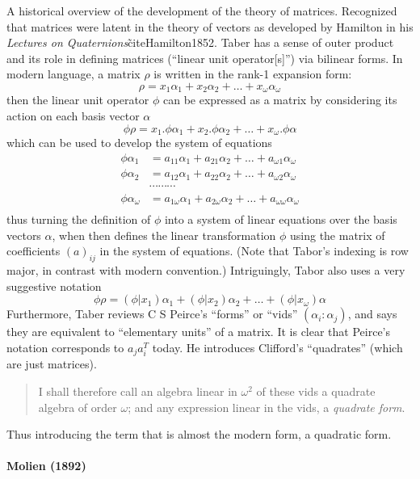 A historical overview of the development of the theory of matrices.
Recognized that matrices were latent in the theory of vectors as developed by Hamilton in his \textit{Lectures on Quaternions}\~cite{Hamilton1852}.
Taber has a sense of outer product and its role in defining matrices (``linear unit operator[s]'') via bilinear forms. In modern language,
a matrix $\rho$ is written in the rank-1 expansion form:
\[
\rho = x_1 \alpha_1 + x_2 \alpha_2 + \dots + x_\omega \alpha_\omega
\]
then the linear unit operator $\phi$ can be expressed as a matrix by considering its action on each basis vector $\alpha$
\[
\phi\rho = x_1.\phi\alpha_1 + x_2.\phi\alpha_2 + \dots + x_\omega.\phi\alpha
\]
which can be used to develop the system of equations
\begin{align}
\phi \alpha_1 & = a_{11} \alpha_1 + a_{21} \alpha_2 + \dots + a_{\omega 1} \alpha_\omega \\
\phi \alpha_2 & = a_{12} \alpha_1 + a_{22} \alpha_2 + \dots + a_{\omega 2} \alpha_\omega \\
              & \cdots \cdots \cdots \\
\phi \alpha_\omega & = a_{1\omega} \alpha_1 + a_{2\omega} \alpha_2 + \dots + a_{\omega \omega} \alpha_\omega \\
\end{align}
thus turning the definition of $\phi$ into a system of linear equations over
the basis vectors $\alpha$, when then defines the linear transformation $\phi$
using the matrix of coefficients ${(a)}_{ij}$ in the system of equations.  (Note
that Tabor's indexing is row major, in contrast with modern convention.)
Intriguingly, Tabor also uses a very suggestive notation
\[
\phi\rho = (\phi|x_1)\alpha_1 + (\phi|x_2)\alpha_2 + \dots + (\phi|x_\omega)\alpha
\]
Furthermore, Taber reviews C S Peirce's ``forms'' or ``vids'' $(\alpha_i :
\alpha_j)$, and says they are equivalent to ``elementary units'' of a matrix.
It is clear that Peirce's notation corresponds to $a_j a_i^T$ today.  He
introduces Clifford's ``quadrates'' (which are just matrices).
\begin{quote}
I shall therefore call an algebra linear in $\omega^2$ of these vids a quadrate
algebra of order $\omega$; and any expression linear in the vids, a
\textit{quadrate form}.
\end{quote}
Thus introducing the term that is almost the modern form, a quadratic form.

\paragraph{Molien (1892)~\cite{Molien1892}}

